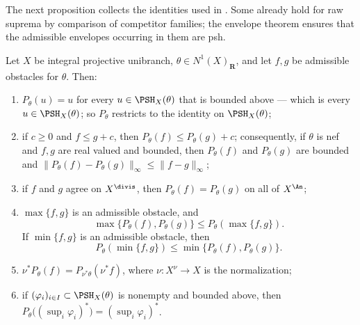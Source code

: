 The next proposition collects the identities used in
.  Some already hold for raw
suprema by comparison of competitor families; the envelope theorem ensures
that the admissible envelopes occurring in them are psh.

\begin{proposition}
\label{prop:ch45-obstacle-calculus-2}
Let $X$ be integral projective unibranch,
$\theta\in N^1(X)_{\mathbf R}$, and let $f,g$ be admissible obstacles
for $\theta$.  Then:
\begin{enumerate}
\item\label{itm:ch45-P:projection}
      $P_\theta(u)=u$ for every $u\in\PSH_X(\theta)$ that is bounded
      above --- which is every $u\in\PSH_X(\theta)$; so $P_\theta$
      restricts to the identity on $\PSH_X(\theta)$;
\item\label{itm:ch45-P:lipschitz}
      if $c\ge0$ and $f\le g+c$, then
      $P_\theta(f)\le P_\theta(g)+c$; consequently, if $\theta$ is nef
      and $f,g$ are real valued and bounded, then $P_\theta(f)$ and
      $P_\theta(g)$ are bounded and
      $\lVert P_\theta(f)-P_\theta(g)\rVert_\infty
        \le\lVert f-g\rVert_\infty$;
\item\label{itm:ch45-P:divisorial}
      if $f$ and $g$ agree on $X^{\divis}$, then
      $P_\theta(f)=P_\theta(g)$ on all of $X^{\An}$;
\item\label{itm:ch45-P:max}
      $\max\{f,g\}$ is an admissible obstacle, and
      \[
       \max\{P_\theta(f),P_\theta(g)\}
       \le P_\theta(\max\{f,g\}).
      \]
      If $\min\{f,g\}$ is an admissible obstacle, then
      \[
       P_\theta(\min\{f,g\})
       \le\min\{P_\theta(f),P_\theta(g)\}.
      \]
\item\label{itm:ch45-P:normalization}
      $\nu^*P_\theta(f)=P_{\nu^*\theta}(\nu^*f)$, where
      $\nu:X^\nu\to X$ is the normalization;
\item\label{itm:ch45-P:envelope-of-family}
      if $(\varphi_i)_{i\in I}\subset\PSH_X(\theta)$ is nonempty and
      bounded above, then
      $P_\theta\bigl((\sup_i\varphi_i)^*\bigr)=(\sup_i\varphi_i)^*$.
\end{enumerate}
\end{proposition}

